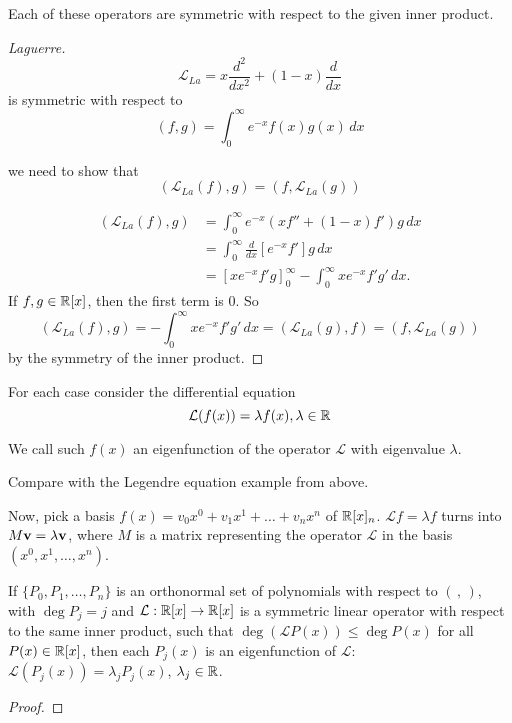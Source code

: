 \documentclass[10pt, a4paper]{article}
\begin{document}
\begin{theorem}
    Each of these operators are symmetric with respect to the given inner product.

    \begin{proof}[Laguerre]
        \[
        \mathcal{L}_{La} = x\frac{d ^ 2}{dx ^ 2} + (1 - x)\frac{d}{dx}
        \]
        is symmetric with respect to
        \[
        (f, g) = \int_{0}^{\infty}e ^ {-x}f(x)g(x)\,dx
        \]

        we need to show that
        \[
        (\mathcal{L}_{La}(f), g) = (f, \mathcal{L}_{La}(g))
        \]

        \begin{align*}
            (\mathcal{L}_{La}(f), g) &= \int_{0}^{\infty}e ^ {-x}(xf'' + (1 - x)f')g\,dx\\
            &= \int_{0}^{\infty}\frac{d}{dx}\left[e ^ {-x}f'\right]g\,dx \\
            &= \left[xe ^ {-x}f'g\right]_{0}^{\infty} - \int_{0}^{\infty}xe ^ {-x}f'g'\,dx.
        \end{align*}
        If $f, g \in \mathbb{R}[x]$,
        then the first term is $0$.
        So
        \[
        (\mathcal{L}_{La}(f), g) = -\int_{0}^{\infty}xe ^ {-x}f'g'\,dx = (\mathcal{L}_{La}(g), f) = (f, \mathcal{L}_{La}(g))
        \]
        by the symmetry of the inner product.
    \end{proof}
\end{theorem}

For each case consider the differential equation
\[
\mathcal{L}(f(x)) = \lambda f(x), \lambda \in \mathbb{R}
\]
\begin{definition}
    We call such $f(x)$ an eigenfunction of the operator $\mathcal{L}$ with eigenvalue $\lambda$.
\end{definition}

Compare with the Legendre equation example from above.

Now,
pick a basis $f(x) = v_0x ^ 0 + v_1x ^ 1 + \dotsc + v_nx ^ n$ of $\mathbb{R}[x]_n$.
$\mathcal{L}f = \lambda f$ turns into $M\mathbf{v} = \lambda\mathbf{v}$,
where $M$ is a matrix representing the operator $\mathcal{L}$ in the basis $(x ^ 0, x ^ 1, \dotsc, x ^ n)$.

\begin{theorem}
    If $\{P_0, P_1, \dotsc, P_n\}$ is an orthonormal set of polynomials with respect to $(\,,\,)$,
    with $\deg{P_j} = j$ and $\mathcal{L} : \mathbb{R}[x] \rightarrow \mathbb{R}[x]$ is a symmetric linear operator with respect to the same inner product,
    such that $\deg(\mathcal{L}P(x)) \leq \deg{P(x)}$ for all $P(x) \in \mathbb{R}[x]$,
    then each $P_j(x)$ is an eigenfunction of $\mathcal{L}$:
    $\mathcal{L}(P_j(x)) = \lambda_jP_j(x)$,
    $\lambda_j \in \mathbb{R}$.

    \begin{proof}
        
    \end{proof}
\end{theorem}
\end{document}
